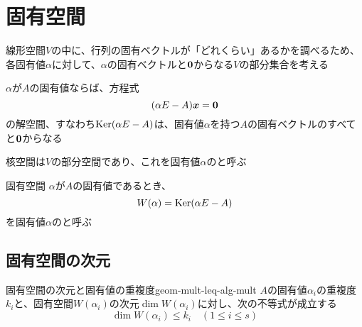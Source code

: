 \documentclass[../../../topic_linear-algebra]{subfiles}
\begin{document}
\sectionline
\section{固有空間}

線形空間$V$の中に、行列の固有ベクトルが「どれくらい」あるかを調べるため、各固有値$\alpha$に対して、$\alpha$の固有ベクトルと$\vb*{0}$からなる$V$の部分集合を考える

\br

$\alpha$が$A$の固有値ならば、方程式
\begin{equation*}
  (\alpha E - A)\vb*{x} = \vb*{0}
\end{equation*}
の解空間、すなわち$\operatorname{Ker}(\alpha E - A)$は、固有値$\alpha$を持つ$A$の固有ベクトルのすべてと$\vb*{0}$からなる

\br

核空間は$V$の部分空間であり、これを固有値$\alpha$のと呼ぶ

\begin{definition*}{固有空間}
  $\alpha$が$A$の固有値であるとき、
  \begin{equation*}
    W(\alpha) = \operatorname{Ker}(\alpha E - A)
  \end{equation*}
  を固有値$\alpha$のと呼ぶ
\end{definition*}

\subsection{固有空間の次元}

\begin{theorem}{固有空間の次元と固有値の重複度}{geom-mult-leq-alg-mult}
  $A$の固有値$\alpha_i$の重複度$k_i$と、固有空間$W(\alpha_i)$の次元$\dim W(\alpha_i)$に対し、次の不等式が成立する
  \begin{equation*}
    \dim W(\alpha_i) \leq k_i \quad (1 \leq i \leq s)
  \end{equation*}
\end{theorem}
\end{document}
